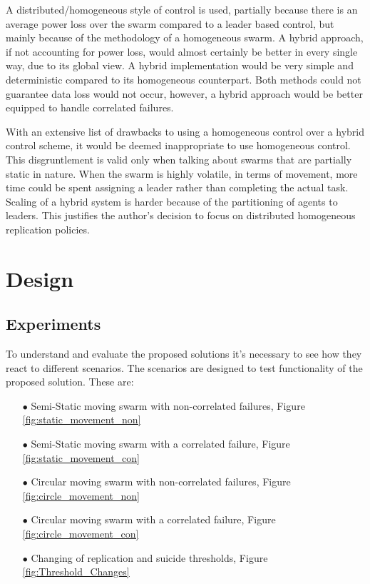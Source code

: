 \documentclass{UoYCSproject}
\begin{document}
A distributed/homogeneous style of control is used, partially because there is an average power loss over the swarm compared to a leader based control, but mainly because of the methodology of a homogeneous swarm. A hybrid approach, if not accounting for power loss, would almost certainly be better in every single way, due to its global view. A hybrid implementation would be very simple and deterministic compared to its homogeneous counterpart. Both methods could not guarantee data loss would not occur, however, a hybrid approach would be better equipped to handle correlated failures.

With an extensive list of drawbacks to using a homogeneous control over a hybrid control scheme, it would be deemed inappropriate to use homogeneous control. This disgruntlement is valid only when talking about swarms that are partially static in nature. When the swarm is highly volatile, in terms of movement, more time could be spent assigning a leader rather than completing the actual task. Scaling of a hybrid system is harder because of the partitioning of agents to leaders. This justifies the author's decision to focus on distributed homogeneous replication policies.




\chapter{Design}
\label{cha:Design}

\section{Experiments}
\label{sec:expriments}

To understand and evaluate the proposed solutions it’s necessary to see how they react to different scenarios.
The scenarios are designed to test functionality of the proposed solution.
These are:

\begin{itemize}
\itemsep-1em
\item[$\bullet$] Semi-Static moving swarm with non-correlated failures, Figure \ref{fig:static_movement_non}
\item[$\bullet$] Semi-Static moving swarm with a correlated failure, Figure \ref{fig:static_movement_con}
\item[$\bullet$] Circular moving swarm with non-correlated failures, Figure \ref{fig:circle_movement_non}
\item[$\bullet$] Circular moving swarm with a correlated failure, Figure \ref{fig:circle_movement_con}
\item[$\bullet$] Changing of replication and suicide thresholds, Figure \ref{fig:Threshold_Changes}
\end{itemize}
\end{document}
